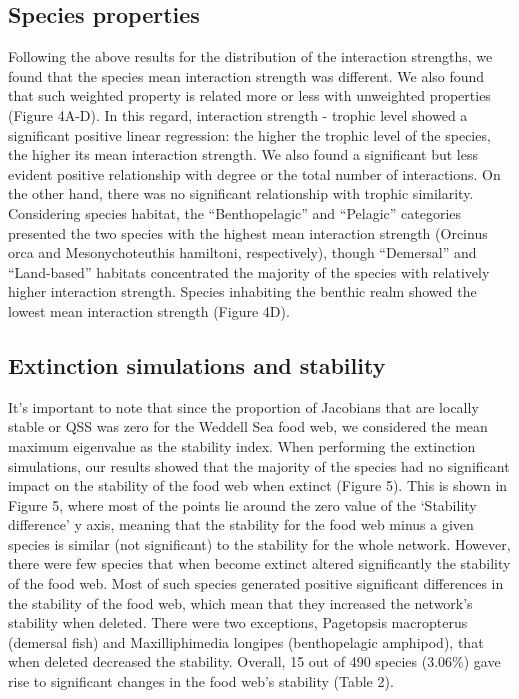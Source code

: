 \documentclass[gc, manuscript]{copernicus}
\begin{document}
\subsection{Species properties}

Following the above results for the distribution of the interaction
strengths, we found that the species mean interaction strength was
different. We also found that such weighted property is related more or
less with unweighted properties (Figure 4A-D). In this regard,
interaction strength - trophic level showed a significant positive
linear regression: the higher the trophic level of the species, the
higher its mean interaction strength. We also found a significant but
less evident positive relationship with degree or the total number of
interactions. On the other hand, there was no significant relationship
with trophic similarity. Considering species habitat, the
``Benthopelagic'' and ``Pelagic'' categories presented the two species
with the highest mean interaction strength (Orcinus orca and
Mesonychoteuthis hamiltoni, respectively), though ``Demersal'' and
``Land-based'' habitats concentrated the majority of the species with
relatively higher interaction strength. Species inhabiting the benthic
realm showed the lowest mean interaction strength (Figure 4D).

\subsection{Extinction simulations and stability}

It's important to note that since the proportion of Jacobians that are
locally stable or QSS was zero for the Weddell Sea food web, we
considered the mean maximum eigenvalue as the stability index. When
performing the extinction simulations, our results showed that the
majority of the species had no significant impact on the stability of
the food web when extinct (Figure 5). This is shown in Figure 5, where
most of the points lie around the zero value of the `Stability
difference' y axis, meaning that the stability for the food web minus a
given species is similar (not significant) to the stability for the
whole network. However, there were few species that when become extinct
altered significantly the stability of the food web. Most of such
species generated positive significant differences in the stability of
the food web, which mean that they increased the network's stability
when deleted. There were two exceptions, Pagetopsis macropterus
(demersal fish) and Maxilliphimedia longipes (benthopelagic amphipod),
that when deleted decreased the stability. Overall, 15 out of 490
species (3.06\%) gave rise to significant changes in the food web's
stability (Table 2).
\end{document}
